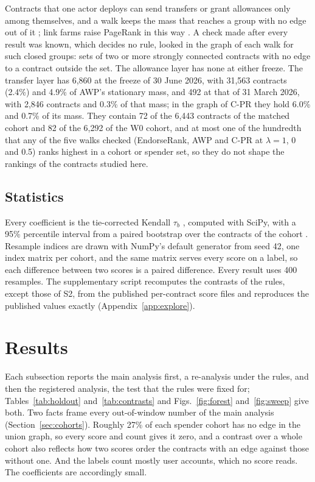 \documentclass{ieeeaccess}
\newcommand{\cpr}{\mbox{C-PR}}
\begin{document}
Contracts that one actor deploys can send transfers or grant allowances only among themselves, and a walk keeps the mass that reaches a group with no edge out of it \cite{langville2006pagerank}; link farms raise PageRank in this way \cite{gyongyi2005alliances}. A check made after every result was known, which decides no rule, looked in the graph of each walk for such closed groups: sets of two or more strongly connected contracts with no edge to a contract outside the set. The allowance layer has none at either freeze. The transfer layer has 6,860 at the freeze of 30 June 2026, with 31,563 contracts (2.4\%) and 4.9\% of AWP's stationary mass, and 492 at that of 31 March 2026, with 2,846 contracts and 0.3\% of that mass; in the graph of \cpr{} they hold 6.0\% and 0.7\% of its mass. They contain 72 of the 6,443 contracts of the matched cohort and 82 of the 6,292 of the W0 cohort, and at most one of the hundredth that any of the five walks checked (EndorseRank, AWP and \cpr{} at $\lambda=1$, 0 and 0.5) ranks highest in a cohort or spender set, so they do not shape the rankings of the contracts studied here.



\subsection{Statistics}
Every coefficient is the tie-corrected Kendall $\tau_b$ \cite{kendall1945ties}, computed with SciPy, with a 95\% percentile interval from a paired bootstrap over the contracts of the cohort \cite{efron1979bootstrap,diciccio1996bootstrap}. Resample indices are drawn with NumPy's default generator from seed 42, one index matrix per cohort, and the same matrix serves every score on a label, so each difference between two scores is a paired difference. Every result uses 400 resamples. The supplementary script recomputes the contrasts of the rules, except those of S2, from the published per-contract score files and reproduces the published values exactly (Appendix~\ref{app:explore}).

\section{Results}
\label{sec:results}

Each subsection reports the main analysis first, a re-analysis under the rules, and then the registered analysis, the test that the rules were fixed for; Tables~\ref{tab:holdout} and~\ref{tab:contrasts} and Figs.~\ref{fig:forest} and~\ref{fig:sweep} give both. Two facts frame every out-of-window number of the main analysis (Section~\ref{sec:cohorts}). Roughly 27\% of each spender cohort has no edge in the union graph, so every score and count gives it zero, and a contrast over a whole cohort also reflects how two scores order the contracts with an edge against those without one. And the labels count mostly user accounts, which no score reads. The coefficients are accordingly small.
\end{document}
